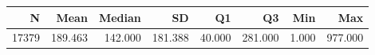 \begin{tabular}{rrrrrrrr}
\toprule
N & Mean & Median & SD & Q1 & Q3 & Min & Max \\
\midrule
17379 & 189.463 & 142.000 & 181.388 & 40.000 & 281.000 & 1.000 & 977.000 \\
\bottomrule
\end{tabular}
